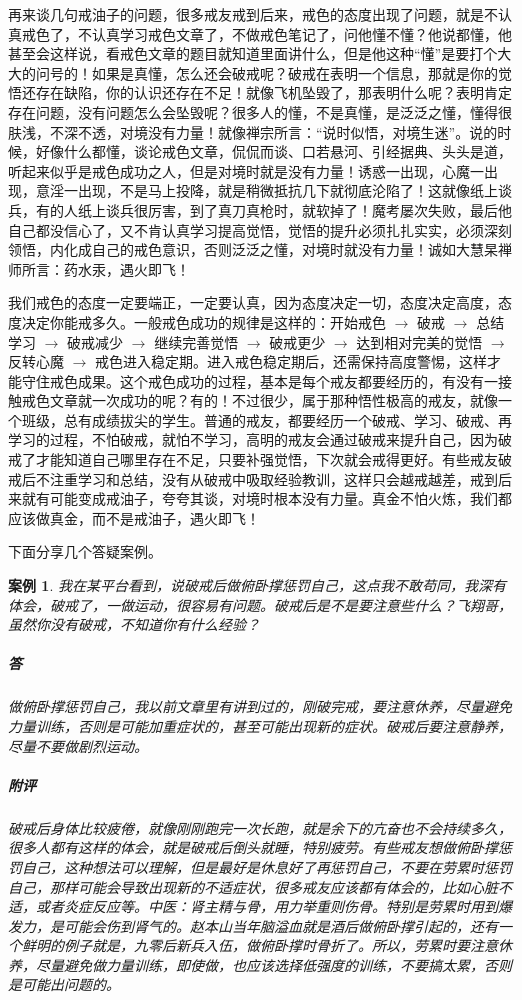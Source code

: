 \documentclass{ctexart}
\newtheorem{case}{案例}
\begin{document}
再来谈几句戒油子的问题，很多戒友戒到后来，戒色的态度出现了问题，就是不认真戒色了，不认真学习戒色文章了，不做戒色笔记了，问他懂不懂？他说都懂，他甚至会这样说，看戒色文章的题目就知道里面讲什么，但是他这种“懂”是要打个大大的问号的！如果是真懂，怎么还会破戒呢？破戒在表明一个信息，那就是你的觉悟还存在缺陷，你的认识还存在不足！就像飞机坠毁了，那表明什么呢？表明肯定存在问题，没有问题怎么会坠毁呢？很多人的懂，不是真懂，是泛泛之懂，懂得很肤浅，不深不透，对境没有力量！就像禅宗所言：“说时似悟，对境生迷”。说的时候，好像什么都懂，谈论戒色文章，侃侃而谈、口若悬河、引经据典、头头是道，听起来似乎是戒色成功之人，但是对境时就是没有力量！诱惑一出现，心魔一出现，意淫一出现，不是马上投降，就是稍微抵抗几下就彻底沦陷了！这就像纸上谈兵，有的人纸上谈兵很厉害，到了真刀真枪时，就软掉了！魔考屡次失败，最后他自己都没信心了，又不肯认真学习提高觉悟，觉悟的提升必须扎扎实实，必须深刻领悟，内化成自己的戒色意识，否则泛泛之懂，对境时就没有力量！诚如大慧杲禅师所言：药水汞，遇火即飞！

我们戒色的态度一定要端正，一定要认真，因为态度决定一切，态度决定高度，态度决定你能戒多久。一般戒色成功的规律是这样的：开始戒色 $\to$ 破戒 $\to$ 总结学习 $\to$ 破戒减少 $\to$ 继续完善觉悟 $\to$ 破戒更少 $\to$ 达到相对完美的觉悟 $\to$ 反转心魔 $\to$ 戒色进入稳定期。进入戒色稳定期后，还需保持高度警惕，这样才能守住戒色成果。这个戒色成功的过程，基本是每个戒友都要经历的，有没有一接触戒色文章就一次成功的呢？有的！不过很少，属于那种悟性极高的戒友，就像一个班级，总有成绩拔尖的学生。普通的戒友，都要经历一个破戒、学习、破戒、再学习的过程，不怕破戒，就怕不学习，高明的戒友会通过破戒来提升自己，因为破戒了才能知道自己哪里存在不足，只要补强觉悟，下次就会戒得更好。有些戒友破戒后不注重学习和总结，没有从破戒中吸取经验教训，这样只会越戒越差，戒到后来就有可能变成戒油子，夸夸其谈，对境时根本没有力量。真金不怕火炼，我们都应该做真金，而不是戒油子，遇火即飞！

下面分享几个答疑案例。

\begin{case}
    我在某平台看到，说破戒后做俯卧撑惩罚自己，这点我不敢苟同，我深有体会，破戒了，一做运动，很容易有问题。破戒后是不是要注意些什么？飞翔哥，虽然你没有破戒，不知道你有什么经验？
    \subparagraph{答} 做俯卧撑惩罚自己，我以前文章里有讲到过的，刚破完戒，要注意休养，尽量避免力量训练，否则是可能加重症状的，甚至可能出现新的症状。破戒后要注意静养，尽量不要做剧烈运动。
    \subparagraph{附评} 破戒后身体比较疲倦，就像刚刚跑完一次长跑，就是余下的亢奋也不会持续多久，很多人都有这样的体会，就是破戒后倒头就睡，特别疲劳。有些戒友想做俯卧撑惩罚自己，这种想法可以理解，但是最好是休息好了再惩罚自己，不要在劳累时惩罚自己，那样可能会导致出现新的不适症状，很多戒友应该都有体会的，比如心脏不适，或者炎症反应等。中医：肾主精与骨，用力举重则伤骨。特别是劳累时用到爆发力，是可能会伤到肾气的。赵本山当年脑溢血就是酒后做俯卧撑引起的，还有一个鲜明的例子就是，九零后新兵入伍，做俯卧撑时骨折了。所以，劳累时要注意休养，尽量避免做力量训练，即使做，也应该选择低强度的训练，不要搞太累，否则是可能出问题的。
\end{case}
\end{document}
